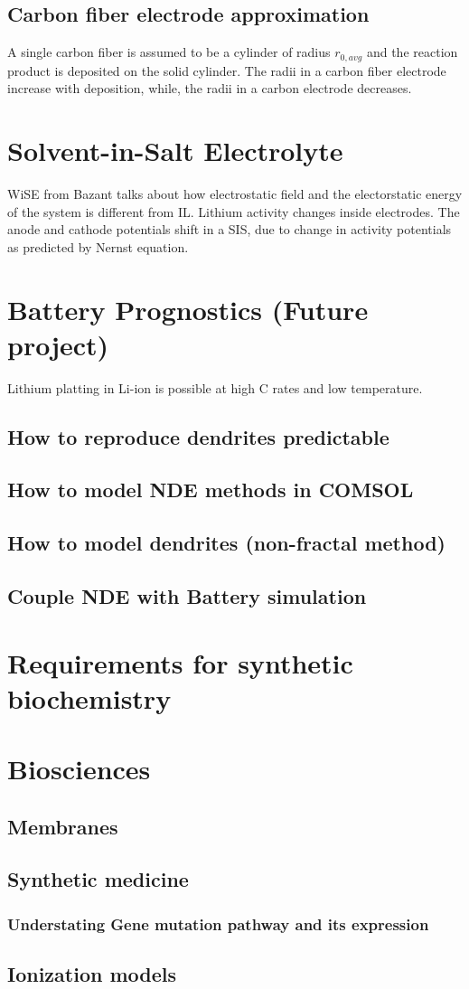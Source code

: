\documentclass[12pt]{book}
\begin{document}
\subsection{Carbon fiber electrode approximation}
A single carbon fiber is assumed to be a cylinder of radius $r_{0,avg}$ and the reaction product is deposited on the solid cylinder. The radii in a carbon fiber electrode increase with deposition, while, the radii in a carbon electrode decreases.
\section{Solvent-in-Salt Electrolyte}
WiSE from Bazant talks about how electrostatic field and the electorstatic energy of the system is different from IL. 
Lithium activity changes inside electrodes. The anode and cathode potentials shift in a SIS, due to change in activity potentials as predicted by Nernst equation.
\section{Battery Prognostics (Future project)}
Lithium platting in Li-ion is possible at high C rates and low temperature. 
\subsection{How to reproduce dendrites predictable}
\subsection{How to model NDE methods in COMSOL}
\subsection{How to model dendrites (non-fractal method)}
\subsection{Couple NDE with Battery simulation}

\section{Requirements for synthetic biochemistry}
\section{Biosciences}
\subsection{Membranes}
\subsection{Synthetic medicine}
\subsubsection{Understating Gene mutation pathway and its expression}


\subsection{Ionization models}
\subsection{}

\newpage


\end{document}
